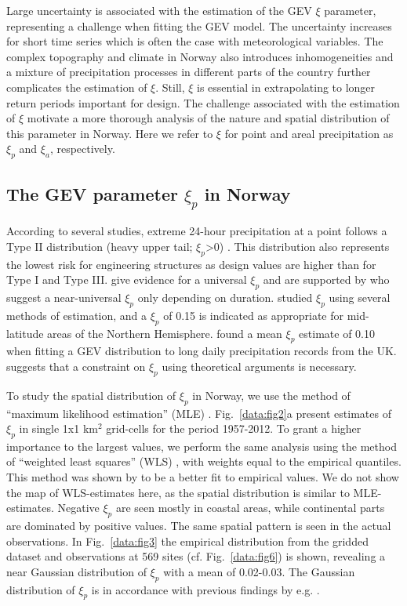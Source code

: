 \documentclass[12pt,a4paper,english]{article}
\begin{document}
Large uncertainty is associated with the estimation of the GEV $\xi$ parameter, representing a challenge when fitting the GEV model. The uncertainty increases for short time series which is often the case with meteorological variables. The complex topography and climate in Norway also introduces inhomogeneities and a mixture of precipitation processes in different parts of the country further complicates the estimation of $\xi$. Still, $\xi$ is essential in extrapolating to longer return periods important for design. The challenge associated with the estimation of $\xi$ motivate a more thorough analysis of the nature and spatial distribution of this parameter in Norway. Here we refer to $\xi$ for point and areal precipitation as $\xi_{p}$ and $\xi_{a}$, respectively.

\subsection{The GEV parameter $\xi_{p}$ in Norway}
 
According to several studies, extreme 24-hour precipitation at a point follows a Type II distribution (heavy upper tail; $\xi_{p}$>0) \citep{Wilks1993,KoutsoyiannisandBaloutsos2000,Katzetal2002,Colesetal2003,ColesandPericchi2003,Koutsoyiannis2004a}. This distribution also represents the lowest risk for engineering structures as design values are higher than for Type I and Type III. \cite{WilsonandToumi2005} give evidence for a universal $\xi_{p}$ and are supported by \cite{Venezianoetal2009} who suggest a near-universal $\xi_{p}$ only depending on duration. \cite{Koutsoyiannis2004b} studied $\xi_{p}$ using several methods of estimation, and a $\xi_{p}$ of 0.15 is indicated as appropriate for mid-latitude areas of the Northern Hemisphere. \cite{WilsonandToumi2005} found a mean $\xi_{p}$ estimate of 0.10 when fitting a GEV distribution to long daily precipitation records from the UK. \cite{Venezianoetal2009} suggests that a constraint on $\xi_{p}$ using theoretical arguments is necessary.  

To study the spatial distribution of $\xi_{p}$ in Norway, we use the method of ``maximum likelihood estimation'' (MLE) \citep{PrescottandWalden1980}. Fig.~\ref{data:fig2}a present estimates of $\xi_{p}$ in single 1x1 km$^2$ grid-cells for the period 1957-2012. To grant a higher importance to the largest values, we perform the same analysis using the method of ``weighted least squares'' (WLS) \citep{Koutsoyiannis2004b}, with weights equal to the empirical quantiles. This method was shown by \cite{Koutsoyiannis2004b} to be a better fit to empirical values. We do not show the map of WLS-estimates here, as the spatial distribution is similar to MLE-estimates. Negative $\xi_{p}$ are seen mostly in coastal areas, while continental parts are dominated by positive values. The same spatial pattern is seen in the actual observations. In Fig.~\ref{data:fig3} the empirical distribution from the gridded dataset and observations at 569 sites (cf. Fig.~\ref{data:fig6}) is shown, revealing a near Gaussian distribution of $\xi_{p}$ with a mean of 0.02-0.03. The Gaussian distribution of $\xi_{p}$ is in accordance with previous findings by e.g. \cite{PapalexiouandKoutsoyiannis2013}.  
\end{document}
